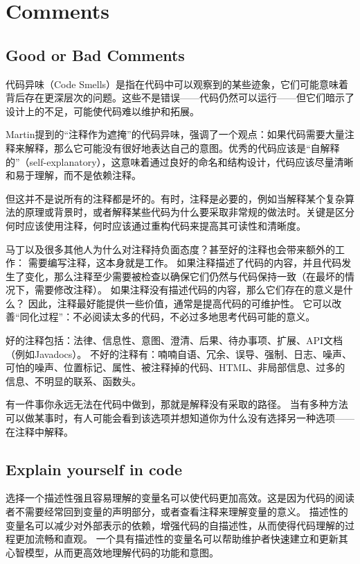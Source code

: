 \chapter{Comments}

\section{Good or Bad Comments}

代码异味（Code Smells）是指在代码中可以观察到的某些迹象，它们可能意味着背后存在更深层次的问题。这些不是错误——代码仍然可以运行——但它们暗示了设计上的不足，可能使代码难以维护和拓展。

Martin提到的“注释作为遮掩”的代码异味，强调了一个观点：如果代码需要大量注释来解释，那么它可能没有很好地表达自己的意图。优秀的代码应该是“自解释的”（self-explanatory），这意味着通过良好的命名和结构设计，代码应该尽量清晰和易于理解，而不是依赖注释。

但这并不是说所有的注释都是坏的。有时，注释是必要的，例如当解释某个复杂算法的原理或背景时，或者解释某些代码为什么要采取非常规的做法时。关键是区分何时应该使用注释，何时应该通过重构代码来提高其可读性和清晰度。

马丁以及很多其他人为什么对注释持负面态度？甚至好的注释也会带来额外的工作：
需要编写注释，这本身就是工作。
如果注释描述了代码的内容，并且代码发生了变化，那么注释至少需要被检查以确保它们仍然与代码保持一致（在最坏的情况下，需要修改注释）。
如果注释没有描述代码的内容，那么它们存在的意义是什么？
因此，注释最好能提供一些价值，通常是提高代码的可维护性。
它可以改善“同化过程”：不必阅读太多的代码，不必过多地思考代码可能的意义。

好的注释包括：法律、信息性、意图、澄清、后果、待办事项、扩展、API文档（例如Javadocs）。
不好的注释有：喃喃自语、冗余、误导、强制、日志、噪声、可怕的噪声、位置标记、属性、被注释掉的代码、HTML、非局部信息、过多的信息、不明显的联系、函数头。

有一件事你永远无法在代码中做到，那就是解释没有采取的路径。
当有多种方法可以做某事时，有人可能会看到该选项并想知道你为什么没有选择另一种选项——在注释中解释。

\section{Explain yourself in code}
选择一个描述性强且容易理解的变量名可以使代码更加高效。这是因为代码的阅读者不需要经常回到变量的声明部分，或者查看注释来理解变量的意义。
描述性的变量名可以减少对外部表示的依赖，增强代码的自描述性，从而使得代码理解的过程更加流畅和直观。
一个具有描述性的变量名可以帮助维护者快速建立和更新其心智模型，从而更高效地理解代码的功能和意图。

